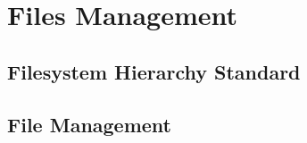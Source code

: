 \chapter{Files Management}


\section{Filesystem Hierarchy Standard}

\section{File Management}


















